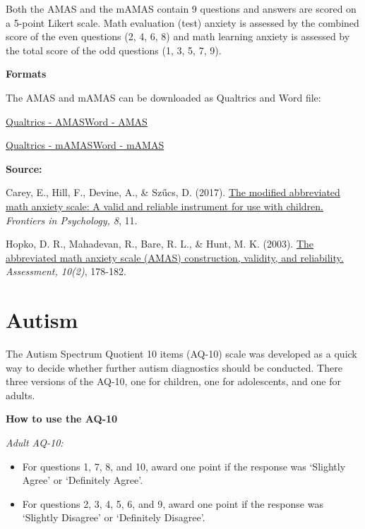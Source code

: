 \documentclass[
]{book}
\providecommand{\tightlist}{%
  \setlength{\itemsep}{0pt}\setlength{\parskip}{0pt}}
\begin{document}
Both the AMAS and the mAMAS contain 9 questions and answers are scored on a 5-point Likert scale. Math evaluation (test) anxiety is assessed by the combined score of the even questions (2, 4, 6, 8) and math learning anxiety is assessed by the total score of the odd questions (1, 3, 5, 7, 9).

\textbf{Formats}

The AMAS and mAMAS can be downloaded as Qualtrics and Word file:

\href{questionnaires/AbbreviatedMathAnxietyScale.qsf}{Qualtrics - AMAS}\textbar{}\href{questionnaires/AbbreviatedMathAnxietyScale.docx}{Word - AMAS}

\href{questionnaires/ModifiedAbbreviatedMathAnxietyScale.qsf}{Qualtrics - mAMAS}\textbar{}\href{questionnaires/ModifiedAbbreviatedMathAnxietyScale.docx}{Word - mAMAS}

\textbf{Source:}

Carey, E., Hill, F., Devine, A., \& Szűcs, D. (2017). \href{https://www.frontiersin.org/articles/10.3389/fpsyg.2017.00011/full}{The modified abbreviated math anxiety scale: A valid and reliable instrument for use with children.} \emph{Frontiers in Psychology, 8}, 11.

Hopko, D. R., Mahadevan, R., Bare, R. L., \& Hunt, M. K. (2003). \href{https://www.researchgate.net/profile/Stephen_Joy/post/Hello_Can_anyone_tell_me_how_to_access_the_Abbreviated_Math_Anxiety_Scale_developed_by_Derek_Hopko2/attachment/59d624eb79197b80779833c8/AS:315374518636545@1452202552608/download/Math+Anxiety+Scale+Abbreviated+2003.pdf}{The abbreviated math anxiety scale (AMAS) construction, validity, and reliability.} \emph{Assessment, 10(2)}, 178-182.

\hypertarget{autism}{%
\section{Autism}\label{autism}}

The Autism Spectrum Quotient 10 items (AQ-10) scale was developed as a quick way to decide whether further autism diagnostics should be conducted. There three versions of the AQ-10, one for children, one for adolescents, and one for adults.

\textbf{How to use the AQ-10}

\emph{Adult AQ-10:}

\begin{itemize}
\tightlist
\item
  For questions 1, 7, 8, and 10, award one point if the response was `Slightly Agree' or `Definitely Agree'.
\item
  For questions 2, 3, 4, 5, 6, and 9, award one point if the response was `Slightly Disagree' or `Definitely Disagree'.
\end{itemize}
\end{document}
